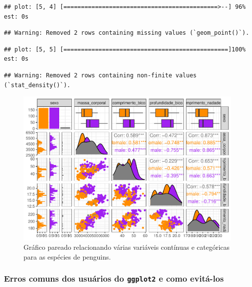 \documentclass[
]{article}
\begin{document}
\begin{verbatim}
## plot: [5, 4] [============================================>--] 96% est: 0s
\end{verbatim}

\begin{verbatim}
## Warning: Removed 2 rows containing missing values (`geom_point()`).
\end{verbatim}

\begin{verbatim}
## plot: [5, 5] [===============================================]100% est: 0s
\end{verbatim}

\begin{verbatim}
## Warning: Removed 2 rows containing non-finite values (`stat_density()`).
\end{verbatim}

\begin{figure}
\centering
\includegraphics{epr_files/figure-latex/fig-pairs-cont-cat-1.pdf}
\caption{\label{fig:fig-pairs-cont-cat}Gráfico pareado relacionando várias variáveis contínuas e categóricas para as espécies de penguins.}
\end{figure}

\hypertarget{erros-comuns-dos-usuuxe1rios-do-ggplot2-e-como-evituxe1-los}{%
\subsubsection{\texorpdfstring{Erros comuns dos usuários do \texttt{ggplot2} e como evitá-los}{Erros comuns dos usuários do ggplot2 e como evitá-los}}\label{erros-comuns-dos-usuuxe1rios-do-ggplot2-e-como-evituxe1-los}}
\end{document}
